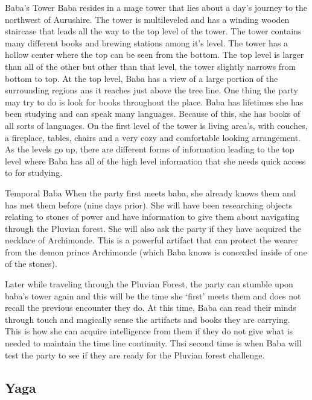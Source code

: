 \begin{commentbox}{Baba's Tower}
	Baba resides in a mage tower that lies about a day's journey to the northwest of Aurushire. The tower is multileveled and has a winding wooden staircase that leads all the way to the top level of the tower. The tower contains many different books and brewing stations among it's level. The tower has a hollow center where the top can be seen from the bottom. The top level is larger than all of the other but other than that level, the tower slightly narrows from bottom to top. At the top level, Baba has a view of a large portion of the surrounding regions ans it reaches just above the tree line. One thing the party may try to do is look for books throughout the place. Baba has lifetimes she has been studying and can speak many languages. Because of this, she has books of all sorts of languages. On the first level of the tower is living area's, with couches, a fireplace, tables, chairs and a very cozy and comfortable looking arrangement. As the levels go up, there are different forms of information leading to the top level where Baba has all of the high level information that she needs quick access to for studying.
\end{commentbox}

\begin{commentbox}{Temporal Baba}
	When the party first meets baba, she already knows them and has met them before (nine days prior). She will have been researching objects relating to stones of power and have information to give them about navigating through the Pluvian forest. She will also ask the party if they have acquired the necklace of Archimonde. This is a powerful artifact that can protect the wearer from the demon prince Archimonde (which Baba knows is concealed inside of one of the stones). 
	
	Later while traveling through the Pluvian Forest, the party can stumble upon baba's tower again and this will be the time she `first' meets them and does not recall the previous encounter they do. At this time, Baba can read their minds through touch and magically sense the artifacts and books they are carrying. This is how she can acquire intelligence from them if they do not give what is needed to maintain the time line continuity. Thsi second time is when Baba will test the party to see if they are ready for the Pluvian forest challenge.
\end{commentbox}

\subsection{Yaga}

